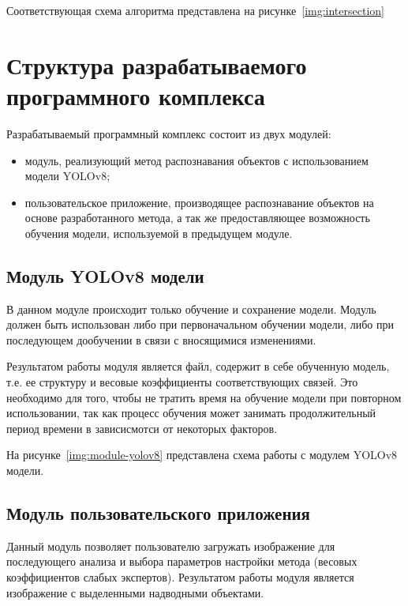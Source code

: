 Соответствующая схема алгоритма представлена на рисунке~\ref{img:intersection}

\section{Структура разрабатываемого программного комплекса}

Разрабатываемый программный комплекс состоит из двух модулей:
\begin{itemize}[label=---]
    \item модуль, реализующий метод распознавания объектов с использованием модели YOLOv8;
    \item пользовательское приложение, производящее распознавание объектов на основе разработанного метода, а так же предоставляющее возможность обучения модели, используемой в предыдущем модуле.
\end{itemize}

\subsection*{Модуль YOLOv8 модели}

В данном модуле происходит только обучение и сохранение модели. Модуль должен быть использован либо при первоначальном обучении модели, либо при последующем дообучении в связи с вносящимися изменениями.

Результатом работы модуля является файл, содержит в себе обученную модель, т.е. ее структуру и весовые коэффициенты соответствующих связей. Это необходимо для того, чтобы не тратить время на обучение модели при повторном использовании, так как процесс обучения может занимать продолжительный период времени в зависисмотси от некоторых факторов.

На рисунке~\ref{img:module-yolov8} представлена схема работы с модулем YOLOv8 модели.



\subsection*{Модуль пользовательского приложения}

Данный модуль позволяет пользователю загружать изображение для последующего анализа и выбора параметров настройки метода (весовых коэффициентов слабых экспертов). Результатом работы модуля является изображение с выделенными надводными объектами.

